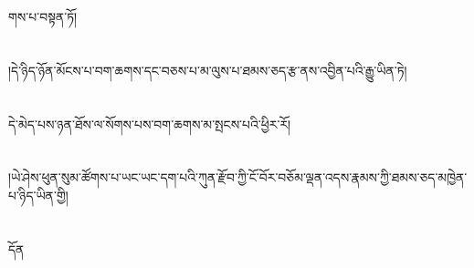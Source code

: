 གས་པ་བསྟན་ཏོ།\chapter{ }།དེ་ཉིད་ཉོན་མོངས་པ་བག་ཆགས་དང་བཅས་པ་མ་ལུས་པ་ཐམས་ཅད་རྩ་ནས་འབྱིན་པའི་རྒྱུ་ཡིན་ཏེ།\chapter{ }དེ་མེད་པས་ཉན་ཐོས་ལ་སོགས་པས་བག་ཆགས་མ་སྤངས་པའི་ཕྱིར་རོ།\chapter{ }།ཡེ་ཤེས་ཕུན་སུམ་ཚོགས་པ་ཡང་ཡང་དག་པའི་ཀུན་རྫོབ་ཀྱི་ངོ་བོར་བཅོམ་ལྡན་འདས་རྣམས་ཀྱི་ཐམས་ཅད་མཁྱེན་པ་ཉིད་ཡིན་གྱི།\chapter{ }དོན